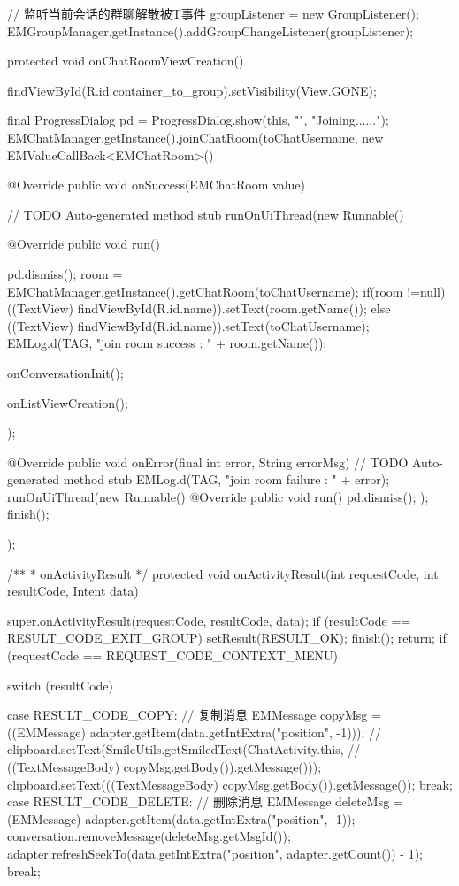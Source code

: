 {{        // 监听当前会话的群聊解散被T事件
        groupListener = new GroupListener();
        EMGroupManager.getInstance().addGroupChangeListener(groupListener);
	}
	
	protected void onChatRoomViewCreation(){
        findViewById(R.id.container_to_group).setVisibility(View.GONE);
        
        final ProgressDialog pd = ProgressDialog.show(this, "", "Joining......");
        EMChatManager.getInstance().joinChatRoom(toChatUsername, new EMValueCallBack<EMChatRoom>() {
        
        @Override
        public void onSuccess(EMChatRoom value) {
            // TODO Auto-generated method stub
             runOnUiThread(new Runnable(){
                   @Override
                   public void run(){
                        pd.dismiss();
                        room = EMChatManager.getInstance().getChatRoom(toChatUsername);
                        if(room !=null){
                            ((TextView) findViewById(R.id.name)).setText(room.getName());
                        }else{
                            ((TextView) findViewById(R.id.name)).setText(toChatUsername);
                        }
                        EMLog.d(TAG, "join room success : " + room.getName());
                        
                        onConversationInit();
                        
                        onListViewCreation();
                   }
               });
        }
        
        @Override
        public void onError(final int error, String errorMsg) {
                // TODO Auto-generated method stub
                EMLog.d(TAG, "join room failure : " + error);
               runOnUiThread(new Runnable(){
                   @Override
                   public void run(){
                       pd.dismiss();
                   }
               });
               finish();
            }
        });
	}
	
	/**
	 * onActivityResult
	 */
	protected void onActivityResult(int requestCode, int resultCode, Intent data) {
		super.onActivityResult(requestCode, resultCode, data);
		if (resultCode == RESULT_CODE_EXIT_GROUP) {
			setResult(RESULT_OK);
			finish();
			return;
		}
		if (requestCode == REQUEST_CODE_CONTEXT_MENU) {
			switch (resultCode) {
			case RESULT_CODE_COPY: // 复制消息
				EMMessage copyMsg = ((EMMessage) adapter.getItem(data.getIntExtra("position", -1)));
				// clipboard.setText(SmileUtils.getSmiledText(ChatActivity.this,
				// ((TextMessageBody) copyMsg.getBody()).getMessage()));
				clipboard.setText(((TextMessageBody) copyMsg.getBody()).getMessage());
				break;
			case RESULT_CODE_DELETE: // 删除消息
				EMMessage deleteMsg = (EMMessage) adapter.getItem(data.getIntExtra("position", -1));
				conversation.removeMessage(deleteMsg.getMsgId());
				adapter.refreshSeekTo(data.getIntExtra("position", adapter.getCount()) - 1);
				break;

}}}}
